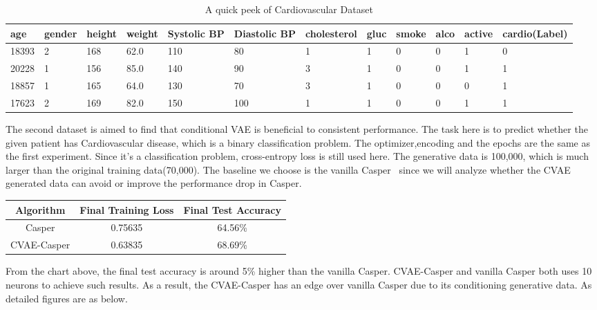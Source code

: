 \begin{table}[]
\begin{tabular}{|l|l|l|l|l|l|l|l|l|l|l|l|}
\hline
age & gender & height & weight & Systolic BP & Diastolic BP & cholesterol & gluc & smoke & alco & active & cardio(Label) \\ \hline
18393 & 2 & 168 & 62.0 & 110 & 80  & 1 & 1 & 0 & 0 & 1 & 0 \\ \hline
20228 & 1 & 156 & 85.0 & 140 & 90  & 3 & 1 & 0 & 0 & 1 & 1 \\ \hline
18857 & 1 & 165 & 64.0 & 130 & 70  & 3 & 1 & 0 & 0 & 0 & 1 \\ \hline
17623 & 2 & 169 & 82.0 & 150 & 100 & 1 & 1 & 0 & 0 & 1 & 1 \\ \hline
\end{tabular}
\caption{A quick peek of Cardiovascular Dataset}
\end{table}



The second dataset is aimed to find that conditional VAE is beneficial to consistent performance. The task here is to predict whether the given patient has Cardiovascular disease, which is a binary classification problem. The optimizer,encoding and the epochs are the same as the first experiment. Since it's a classification problem, cross-entropy loss is still used here.  The generative data is 100,000, which is much larger than the original training data(70,000). The baseline we choose is the vanilla Casper~\cite{CASPER1997} since we will analyze whether the CVAE generated data can avoid or improve the performance drop in Casper.

\begin{center}
\begin{tabular}{ c c c }
\hline
 Algorithm & Final Training Loss & Final Test Accuracy \\ 
\hline
 Casper & 0.75635 & 64.56\% \\  
\hline
 CVAE-Casper & 0.63835 & 68.69\% \\
\hline
\end{tabular}
\end{center}
From the chart above, the final test accuracy is around 5\% higher than the vanilla Casper. CVAE-Casper and vanilla Casper both uses 10 neurons to achieve such results. As a result, the CVAE-Casper has an edge over vanilla Casper due to its conditioning generative data. As detailed figures are as below.

